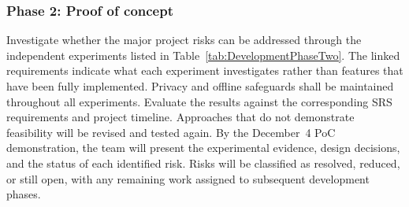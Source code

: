 \documentclass[10pt]{article}
\begin{document}
\subsubsection*{Phase 2: Proof of concept}

Investigate whether the major project risks can be addressed
through the independent experiments listed in
Table~\ref{tab:DevelopmentPhaseTwo}. The linked requirements
indicate what each experiment investigates rather than
features that have been fully implemented. Privacy and
offline safeguards shall be maintained throughout all
experiments. Evaluate the results against the corresponding
SRS requirements and project timeline. Approaches that do
not demonstrate feasibility will be revised and tested again.
By the December~4 PoC demonstration, the team will present
the experimental evidence, design decisions, and the status
of each identified risk. Risks will be classified as resolved,
reduced, or still open, with any remaining work assigned
to subsequent development phases.
\end{document}
